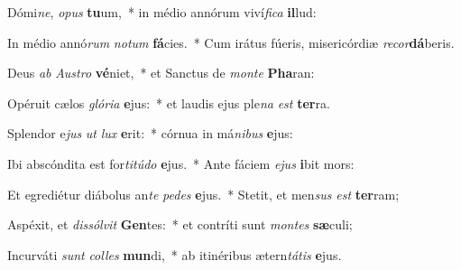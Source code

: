 \item Dómi\textit{ne}, \textit{o}\textit{pus} \textbf{tu}um,~* in médio annórum viví\textit{fi}\textit{ca} \textbf{il}lud:
\item In médio annó\textit{rum} \textit{no}\textit{tum} \textbf{fá}cies.~* Cum irátus fúeris, misericórdiæ \textit{re}\textit{cor}\textbf{dá}beris.
\item Deus \textit{ab} \textit{Aus}\textit{tro} \textbf{vé}niet,~* et Sanctus de \textit{mon}\textit{te} \textbf{Pha}ran:
\item Opéruit cælos \textit{gló}\textit{ri}\textit{a} \textbf{e}jus:~* et laudis ejus ple\textit{na} \textit{est} \textbf{ter}ra.
\item Splendor e\textit{jus} \textit{ut} \textit{lux} \textbf{e}rit:~* córnua in má\textit{ni}\textit{bus} \textbf{e}jus:
\item Ibi abscóndita est for\textit{ti}\textit{tú}\textit{do} \textbf{e}jus.~* Ante fáciem \textit{e}\textit{jus} \textbf{i}bit mors:
\item Et egrediétur diábolus an\textit{te} \textit{pe}\textit{des} \textbf{e}jus.~* Stetit, et men\textit{sus} \textit{est} \textbf{ter}ram;
\item Aspéxit, et \textit{dis}\textit{sól}\textit{vit} \textbf{Gen}tes:~* et contríti sunt \textit{mon}\textit{tes} \textbf{sæ}culi;
\item Incurváti \textit{sunt} \textit{col}\textit{les} \textbf{mun}di,~* ab itinéribus ætern\textit{tá}\textit{tis} \textbf{e}jus.
